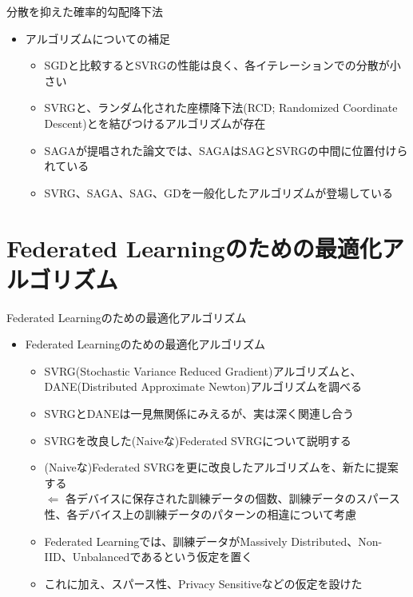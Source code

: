 \documentclass[dvipdfmx,notheorems,t]{beamer}
\begin{document}
\begin{frame}{分散を抑えた確率的勾配降下法}

\begin{itemize}
	\item アルゴリズムについての補足
	\begin{itemize}
		\item SGDと比較するとSVRGの性能は良く、各イテレーションでの分散が小さい
		\newline
		
		\item SVRGと、ランダム化された座標降下法(RCD; Randomized Coordinate Descent)とを結びつけるアルゴリズムが存在
		\item SAGAが提唱された論文では、SAGAはSAGとSVRGの中間に位置付けられている
		\item SVRG、SAGA、SAG、GDを一般化したアルゴリズムが登場している
	\end{itemize}
\end{itemize}

\end{frame}

\section{Federated Learningのための最適化アルゴリズム}

\begin{frame}{Federated Learningのための最適化アルゴリズム}

\begin{itemize}
	\item Federated Learningのための最適化アルゴリズム
	\begin{itemize}
		\item \alert{SVRG}(Stochastic Variance Reduced Gradient)アルゴリズムと、\alert{DANE}(Distributed Approximate Newton)アルゴリズムを調べる
		\item SVRGとDANEは一見無関係にみえるが、実は深く関連し合う
		\newline
		
		\item SVRGを改良した(Naiveな)\alert{Federated SVRG}について説明する
		\item (Naiveな)Federated SVRGを更に改良したアルゴリズムを、新たに提案する \\
		$\Leftarrow$ 各デバイスに保存された訓練データの個数、訓練データのスパース性、各デバイス上の訓練データのパターンの相違について考慮
		\newline
		
		\item Federated Learningでは、訓練データが\alert{Massively Distributed}、\alert{Non-IID}、\alert{Unbalanced}であるという仮定を置く
		\item これに加え、\alert{スパース性}、\alert{Privacy Sensitive}などの仮定を設けた
	\end{itemize}
\end{itemize}

\end{frame}
\end{document}
